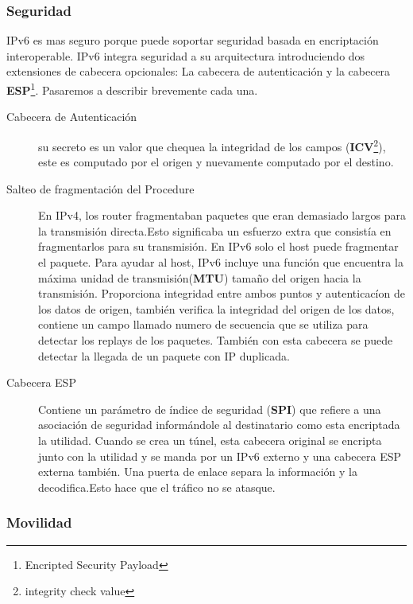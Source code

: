 \documentclass[11pt,a4paper]{article}
\begin{document}
\subsubsection{Seguridad}
IPv6 es mas seguro porque puede soportar seguridad basada en encriptación interoperable. IPv6 
integra seguridad a su arquitectura introduciendo dos extensiones de cabecera opcionales: La 
cabecera de autenticación y la cabecera \textbf{ESP}\footnote{Encripted Security Payload}. Pasaremos 
a describir brevemente cada una. 
\begin{description}
\item[Cabecera de Autenticación] su secreto es un valor que chequea la integridad de los campos 
(\textbf{ICV}\footnote{integrity check value}), este es computado por el origen y nuevamente 
computado por el destino.
\item[Salteo de fragmentación del Procedure] En IPv4, los router fragmentaban paquetes que eran 
demasiado largos para la transmisión directa.Esto significaba un esfuerzo extra que consistía en 
fragmentarlos para su transmisión. En IPv6 solo el host puede fragmentar el paquete. Para ayudar al 
host, IPv6 incluye una función que encuentra la máxima unidad de transmisión(\textbf{MTU}) tamaño 
del origen hacia la transmisión. Proporciona integridad entre ambos puntos y autenticacíon de los 
datos de origen, también verifica la integridad del origen de los datos, contiene un campo llamado  
numero de secuencia que se utiliza para detectar los replays de los paquetes. También con esta 
cabecera se puede detectar la llegada de un paquete con IP duplicada.
\item[Cabecera ESP] Contiene un parámetro de índice de seguridad (\textbf{SPI}) que refiere a una 
asociación de seguridad informándole al destinatario como esta encriptada la utilidad. Cuando se 
crea un túnel, esta  cabecera original se encripta junto con la utilidad y se manda por un IPv6 
externo y una cabecera ESP externa también. Una puerta de enlace separa la información y la 
decodifica.Esto hace que el tráfico no se atasque.
\end {description}
\subsubsection{Movilidad}
\end{document}
